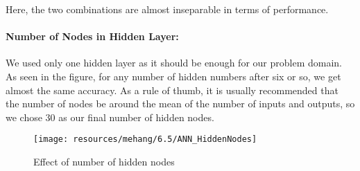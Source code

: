 \begin{table}[h!]
        \caption{Valence}
        \begin{center}
        \end{center}
\end{table}

Here, the two combinations are almost inseparable in terms of performance. 

\paragraph{Number of Nodes in Hidden Layer:}

We used only one hidden layer as it should be enough for our problem domain. 
As seen in the figure, for any number of hidden numbers after six or so, we get almost the same accuracy. As a rule of thumb, it is usually recommended that the number of nodes be around the mean of the number of inputs and outputs, so we chose 30 as our final number of hidden nodes.\\

\begin{figure}[h!]
        \centering
        \texttt{[image: resources/mehang/6.5/ANN\_HiddenNodes]}
        \caption{Effect of number of hidden nodes}
\end{figure}

